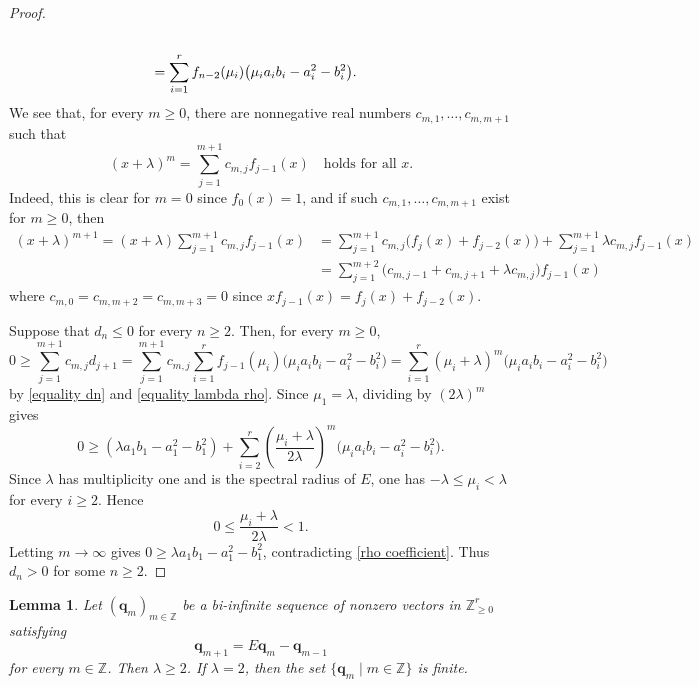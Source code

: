 \documentclass{amsart}
\newtheorem{lem}[thm]{Lemma}
\theoremstyle{definition}
\theoremstyle{remark}
\numberwithin{equation}{thm}
\def\le{\leqslant}
\def\ge{\geqslant}
\def\Z{\mathbb{Z}}
\def\bfq{\mathbf{q}}
\begin{document}
\begin{proof}
\begin{align}
\\  
&=\sum_{i=1}^r f_{n-2}(\mu_i)\bigl(\mu_i a_ib_i-a_i^2-b_i^2\bigr). \notag
\end{align}
We see that, for every $m\ge0$, there are nonnegative real numbers
$c_{m,1},\ldots,c_{m,m+1}$ such that
\begin{equation}\label{equality lambda rho}
(x+\lambda)^m=\sum_{j=1}^{m+1}c_{m,j}f_{j-1}(x)  \quad \text{holds for all $x$}.
\end{equation}
Indeed, this is clear for $m=0$ since $f_0(x)=1$, and if such $c_{m,1},\ldots,c_{m,m+1}$ exist for $m\ge 0$, then 
\begin{align*}
(x+\lambda)^{m+1}=(x+\lambda)\sum_{j=1}^{m+1}c_{m,j}f_{j-1}(x)&=\sum_{j=1}^{m+1}c_{m,j}\bigl(f_j(x)+f_{j-2}(x)\bigr)+\sum_{j=1}^{m+1}\lambda c_{m,j}f_{j-1}(x)\\
&=\sum_{j=1}^{m+2}\bigl(c_{m,j-1}+c_{m,j+1}+\lambda c_{m,j}\bigr)f_{j-1}(x)
\end{align*}
where $c_{m,0}=c_{m,m+2}=c_{m,m+3}=0$ since $x f_{j-1}(x)=f_j(x)+f_{j-2}(x)$.

Suppose that $d_n\le0$ for every $n\ge2$. Then, for every $m\ge0$,
$$
0\ge\sum_{j=1}^{m+1}c_{m,j}d_{j+1}=\sum_{j=1}^{m+1}c_{m,j}\sum_{i=1}^r f_{j-1}(\mu_i)\bigl(\mu_i a_ib_i-a_i^2-b_i^2\bigr)
=\sum_{i=1}^r(\mu_i+\lambda)^m\bigl(\mu_i a_ib_i-a_i^2-b_i^2\bigr)
$$
by \eqref{equality dn} and \eqref{equality lambda rho}.
Since $\mu_1=\lambda$, dividing by $(2\lambda)^m$ gives
$$
0\ge (\lambda a_1b_1-a_1^2-b_1^2)+\sum_{i=2}^r \left(\frac{\mu_i+\lambda}{2\lambda}\right)^m \bigl(\mu_i a_ib_i-a_i^2-b_i^2\bigr).
$$
Since $\lambda$ has multiplicity one and is the spectral radius of $E$, one has
$-\lambda\le\mu_i<\lambda$ for every $i\ge2$. Hence
$$
0\le\frac{\mu_i+\lambda}{2\lambda}<1.
$$
Letting $m\to\infty$ gives $0\ge \lambda a_1b_1-a_1^2-b_1^2$, contradicting \eqref{rho coefficient}. Thus $d_n>0$ for some $n\ge2$.
\end{proof}

\begin{lem}\label{two sided zenkashiki}
Let $(\bfq_m)_{m\in\Z}$ be a bi-infinite sequence of nonzero vectors in $\Z_{\ge0}^r$ satisfying
$$
\bfq_{m+1}=E\bfq_m-\bfq_{m-1}
$$
for every $m\in\Z$. Then $\lambda\ge2$.  If $\lambda=2$, then the set $\{\bfq_m\mid m\in\Z\}$ is finite.
\end{lem}
\end{document}
